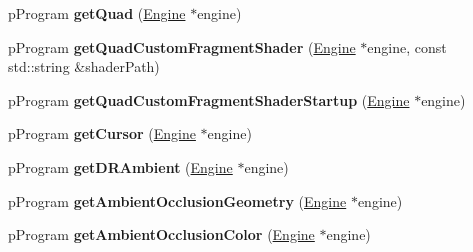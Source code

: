 \begin{DoxyCompactItemize}
\item 
\hypertarget{classfillwave_1_1loader_1_1ProgramLoader_a9af48c24bc23886bdbb972674cf68424}{}p\+Program {\bfseries get\+Quad} (\hyperlink{classfillwave_1_1Engine}{Engine} $\ast$engine)\label{classfillwave_1_1loader_1_1ProgramLoader_a9af48c24bc23886bdbb972674cf68424}

\item 
\hypertarget{classfillwave_1_1loader_1_1ProgramLoader_a7dd9b3ed80ce978cfdaf30225376dd0b}{}p\+Program {\bfseries get\+Quad\+Custom\+Fragment\+Shader} (\hyperlink{classfillwave_1_1Engine}{Engine} $\ast$engine, const std\+::string \&shader\+Path)\label{classfillwave_1_1loader_1_1ProgramLoader_a7dd9b3ed80ce978cfdaf30225376dd0b}

\item 
\hypertarget{classfillwave_1_1loader_1_1ProgramLoader_a44d43df17c1bf10ebfb5bba4f564705e}{}p\+Program {\bfseries get\+Quad\+Custom\+Fragment\+Shader\+Startup} (\hyperlink{classfillwave_1_1Engine}{Engine} $\ast$engine)\label{classfillwave_1_1loader_1_1ProgramLoader_a44d43df17c1bf10ebfb5bba4f564705e}

\item 
\hypertarget{classfillwave_1_1loader_1_1ProgramLoader_a6887ec9ba9d7e0e6c1d85989c7d36416}{}p\+Program {\bfseries get\+Cursor} (\hyperlink{classfillwave_1_1Engine}{Engine} $\ast$engine)\label{classfillwave_1_1loader_1_1ProgramLoader_a6887ec9ba9d7e0e6c1d85989c7d36416}

\item 
\hypertarget{classfillwave_1_1loader_1_1ProgramLoader_ab37f1eea1887a7466806372065068bbb}{}p\+Program {\bfseries get\+D\+R\+Ambient} (\hyperlink{classfillwave_1_1Engine}{Engine} $\ast$engine)\label{classfillwave_1_1loader_1_1ProgramLoader_ab37f1eea1887a7466806372065068bbb}

\item 
\hypertarget{classfillwave_1_1loader_1_1ProgramLoader_afff7bc5d2eadb16080644e0c8dbee08d}{}p\+Program {\bfseries get\+Ambient\+Occlusion\+Geometry} (\hyperlink{classfillwave_1_1Engine}{Engine} $\ast$engine)\label{classfillwave_1_1loader_1_1ProgramLoader_afff7bc5d2eadb16080644e0c8dbee08d}

\item 
\hypertarget{classfillwave_1_1loader_1_1ProgramLoader_aa33882d632771ac71d4fda0bbdbc1dbe}{}p\+Program {\bfseries get\+Ambient\+Occlusion\+Color} (\hyperlink{classfillwave_1_1Engine}{Engine} $\ast$engine)\label{classfillwave_1_1loader_1_1ProgramLoader_aa33882d632771ac71d4fda0bbdbc1dbe}


\end{DoxyCompactItemize}
